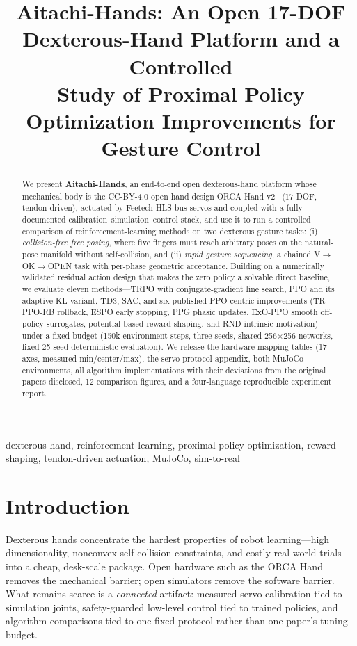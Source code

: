 \documentclass[conference]{IEEEtran}
\begin{document}
\title{Aitachi-Hands: An Open 17-DOF Dexterous-Hand Platform and a Controlled\\
Study of Proximal Policy Optimization Improvements for Gesture Control}

\author{
}

\maketitle

\begin{abstract}
We present \textbf{Aitachi-Hands}, an end-to-end open dexterous-hand platform whose mechanical body is the CC-BY-4.0 open hand design ORCA Hand v2~\cite{orca} (17 DOF, tendon-driven), actuated by Feetech HLS bus servos and coupled with a
fully documented calibration--simulation--control stack, and use it to run a
controlled comparison of reinforcement-learning methods on two dexterous
gesture tasks: (i) \emph{collision-free free posing}, where five fingers must
reach arbitrary poses on the natural-pose manifold without self-collision, and
(ii) \emph{rapid gesture sequencing}, a chained V$\to$OK$\to$OPEN task with
per-phase geometric acceptance. Building on a numerically validated residual
action design that makes the zero policy a solvable direct baseline, we
evaluate eleven methods---TRPO with conjugate-gradient line search, PPO and
its adaptive-KL variant, TD3, SAC, and six published PPO-centric improvements
(TR-PPO-RB rollback, ESPO early stopping, PPG phasic updates, ExO-PPO smooth
off-policy surrogates, potential-based reward shaping, and RND intrinsic
motivation) under a fixed budget (150k environment steps,
three seeds, shared 256$\times$256 networks, fixed 25-seed deterministic
evaluation). We release the hardware mapping tables (17 axes, measured
min/center/max), the servo protocol appendix, both MuJoCo environments, all
algorithm implementations with their deviations from the original papers
disclosed, 12 comparison figures, and a four-language reproducible experiment
report.
\end{abstract}

\begin{IEEEkeywords}
dexterous hand, reinforcement learning, proximal policy optimization,
reward shaping, tendon-driven actuation, MuJoCo, sim-to-real
\end{IEEEkeywords}

\section{Introduction}
Dexterous hands concentrate the hardest properties of robot learning---high
dimensionality, nonconvex self-collision constraints, and costly real-world
trials---into a cheap, desk-scale package. Open hardware such as the ORCA
Hand~\cite{orca} removes the mechanical barrier; open simulators remove the
software barrier. What remains scarce is a \emph{connected} artifact: measured
servo calibration tied to simulation joints, safety-guarded low-level control
tied to trained policies, and algorithm comparisons tied to one fixed
protocol rather than one paper's tuning budget.
\end{document}
